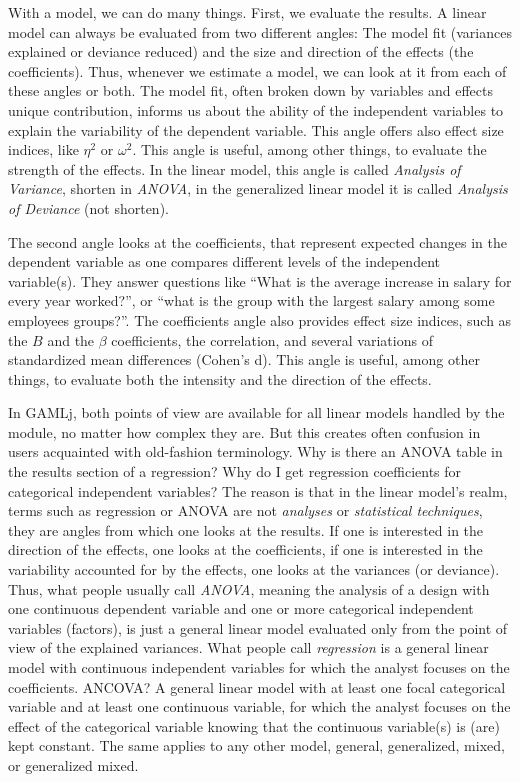 \documentclass[
]{book}
\begin{document}
With a model, we can do many things. First, we evaluate the results. A linear model can always be evaluated from two different angles: The model fit (variances explained or deviance reduced) and the size and direction of the effects (the coefficients). Thus, whenever we estimate a model, we can look at it from each of these angles or both. The model fit, often broken down by variables and effects unique contribution, informs us about the ability of the independent variables to explain the variability of the dependent variable. This angle offers also effect size indices, like \(\eta^2\) or \(\omega^2\). This angle is useful, among other things, to evaluate the strength of the effects. In the linear model, this angle is called \emph{Analysis of Variance}, shorten in \emph{ANOVA}, in the generalized linear model it is called \emph{Analysis of Deviance} (not shorten).

The second angle looks at the coefficients, that represent expected changes in the dependent variable as one compares different levels of the independent variable(s). They answer questions like ``What is the average increase in salary for every year worked?'', or ``what is the group with the largest salary among some employees groups?''. The coefficients angle also provides effect size indices, such as the \(B\) and the \(\beta\) coefficients, the correlation, and several variations of standardized mean differences (Cohen's d). This angle is useful, among other things, to evaluate both the intensity and the direction of the effects.

In {GAMLj}, both points of view are available for all linear models handled by the module, no matter how complex they are. But this creates often confusion in users acquainted with old-fashion terminology. Why is there an ANOVA table in the results section of a regression? Why do I get regression coefficients for categorical independent variables? The reason is that in the linear model's realm, terms such as regression or ANOVA are not \emph{analyses} or \emph{statistical techniques}, they are angles from which one looks at the results. If one is interested in the direction of the effects, one looks at the coefficients, if one is interested in the variability accounted for by the effects, one looks at the variances (or deviance). Thus, what people usually call \emph{ANOVA}, meaning the analysis of a design with one continuous dependent variable and one or more categorical independent variables (factors), is just a general linear model evaluated only from the point of view of the explained variances. What people call \emph{regression} is a general linear model with continuous independent variables for which the analyst focuses on the coefficients. ANCOVA? A general linear model with at least one focal categorical variable and at least one continuous variable, for which the analyst focuses on the effect of the categorical variable knowing that the continuous variable(s) is (are) kept constant. The same applies to any other model, general, generalized, mixed, or generalized mixed.
\end{document}
